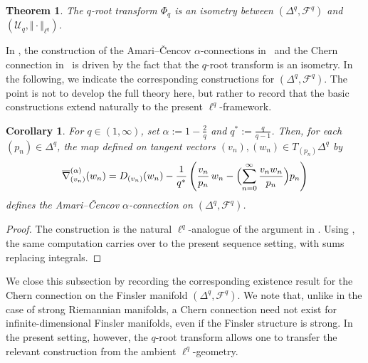 \documentclass[12pt]{amsart}
\newtheorem{theorem}{Theorem}[section]
\newtheorem{corollary}[corollary]{Corollary}
\numberwithin{figure}{section}
\numberwithin{table}{section}
\numberwithin{equation}{section}
\begin{document}
\begin{theorem}\label{T: q-root transform as isom}
    The \(q\)-root transform \(\varPhi_q\) is an isometry between \(\left( \Delta^q, \mathcal{F}^q \right)\) and \(\left( \mathcal{U}_q, \Vert \cdot \Vert_{\ell^q} \right)\).
\end{theorem}

In \cite{bauerLpFisherRaoMetricAmari2024}, the construction of the Amari--\v{C}encov \(\alpha\)-connections in~\cite[Lemma~4.1]{bauerLpFisherRaoMetricAmari2024} and the Chern connection in~\cite[Thm.~4.6]{bauerLpFisherRaoMetricAmari2024} is driven by the fact that the \(q\)-root transform is an isometry. In the following, we indicate the corresponding constructions for \((\Delta^q, \mathcal{F}^q)\). The point is not to develop the full theory here, but rather to record that the basic constructions extend naturally to the present \(\ell^q\)-framework.

\begin{corollary}\label{L: alpha-connection on Deltaq}
For \(q \in (1,\infty)\), set \(\alpha := 1-\frac{2}{q}\) and \(q^* := \frac{q}{q-1}\).
Then, for each \((p_n) \in \Delta^q\), the map defined on tangent vectors \((v_n),(w_n)\in T_{(p_n)}\Delta^q\) by
\begin{equation}\label{e: alpha-connection on Deltaq}
    \overline{\nabla}^{(\alpha)}_{(v_n)} (w_n)
    =
    D_{(v_n)} (w_n)
    - \frac{1}{q^*}
    \left(
        \frac{v_n}{p_n}\, w_n
        -
        \Bigl(
            \sum_{n=0}^\infty \frac{v_n w_n}{p_n}
        \Bigr) p_n
    \right)
\end{equation}
defines the Amari--\v{C}encov \(\alpha\)-connection on \((\Delta^q, \mathcal{F}^q)\).
\end{corollary}

\begin{proof}
The construction is the natural \(\ell^q\)-analogue of the argument in \cite[Lemma~4.1]{bauerLpFisherRaoMetricAmari2024}. Using , the same computation carries over to the present sequence setting, with sums replacing integrals.
\end{proof}

We close this subsection by recording the corresponding existence result for the Chern connection on the Finsler manifold \((\Delta^q,\mathcal F^q)\). We note that, unlike in the case of strong Riemannian manifolds, a Chern connection need not exist for infinite-dimensional Finsler manifolds, even if the Finsler structure is strong. In the present setting, however, the \(q\)-root transform allows one to transfer the relevant construction from the ambient \(\ell^q\)-geometry.
\end{document}
